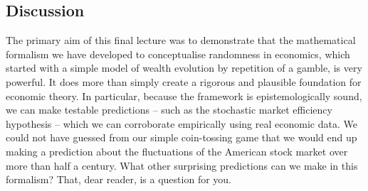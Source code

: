 \subsection{Discussion}
The primary aim of this final lecture was to demonstrate that the mathematical formalism we have developed to conceptualise randomness in economics, which started with a simple model of wealth evolution by repetition of a gamble, is very powerful. It does more than simply create a rigorous and plausible foundation for economic theory. In particular, because the framework is epistemologically sound, we can make testable predictions -- such as the stochastic market efficiency hypothesis -- which we can corroborate empirically using real economic data. We could not have guessed from our simple coin-tossing game that we would end up making a prediction about the fluctuations of the American stock market over more than half a century. What other surprising predictions can we make in this formalism? That, dear reader, is a question for you.

